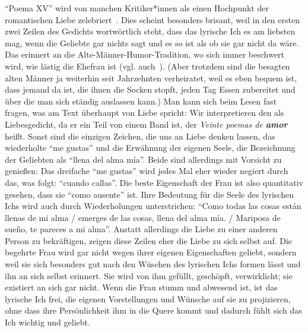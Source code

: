 ``Poema XV'' wird von manchen Kritiker*innen als einen Hochpunkt der romantischen Liebe zelebriert~\cite{Lagos1975}.
Dies scheint besonders brisant, weil in den ersten zwei Zeilen des Gedichts wortwörtlich steht, dass das lyrische Ich es am liebsten mag, wenn die Geliebte gar nichts sagt und es so ist als ob sie gar nicht da wäre.
Das erinnert an die Alte-Männer-Humor-Tradition, wo sich immer beschwert wird, wie lästig die Ehefrau ist (vgl. auch~\cite{Stromquist2018}).
(Aber trotzdem sind die besagten alten Männer ja weiterhin seit Jahrzehnten verheiratet, weil es eben bequem ist, dass jemand da ist, die ihnen die Socken stopft, jeden Tag Essen zubereitet und über die man sich ständig auslassen kann.)
Man kann sich beim Lesen fast fragen, was am Text überhaupt von Liebe spricht:
Wir interpretieren den als Liebesgedicht, da er ein Teil von einem Band ist, der \textit{Veinte poemas de \textbf{amor}} heißt.
Sonst sind die einzigen Zeichen, die uns an Liebe denken lassen, das wiederholte ``me gustas'' und die Erwähnung der eigenen Seele, die Bezeichnung der Geliebten als ``llena del alma mía''.
Beide sind allerdings mit Vorsicht zu genießen:
Das dreifache ``me gustas'' wird jedes Mal eher wieder negiert durch das, was folgt: ``cuando callas''.
Die beste Eigenschaft der Frau ist also quantitativ gesehen, dass sie ``como ausente'' ist.
Ihre Bedeutung für die Seele des lyrischen Ichs wird auch durch Wiederholungen unterstrichen: ``Como todas las cosas están llenas de mi alma / emerges de las cosas, llena del alma mía. / Mariposa de sueño, te pareces a mi alma''.
Anstatt allerdings die Liebe zu einer anderen Person zu bekräftigen, zeigen diese Zeilen eher die Liebe zu sich selbst auf.
Die begehrte Frau wird gar nicht wegen ihrer eigenen Eigenschaften geliebt, sondern weil sie sich besonders gut nach den Wüschen des lyrischen Ichs formen lässt und ihn an sich selbst erinnert.
Sie wird von ihm gefüllt, geschöpft, verwirklicht; sie existiert an sich gar nicht.
Wenn die Frau stumm und abwesend ist, ist das lyrische Ich frei, die eigenen Vorstellungen und Wünsche auf sie zu projizieren, ohne dass ihre Persönlichkeit ihm in die Quere kommt und dadurch fühlt sich das Ich wichtig und geliebt.

